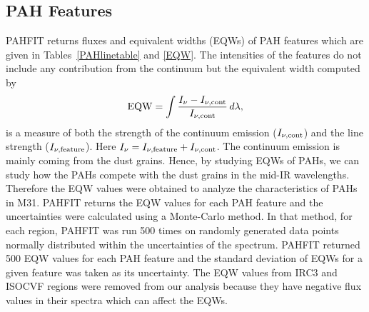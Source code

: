 \subsection{PAH Features}

PAHFIT returns fluxes and equivalent widths (EQWs) of PAH features which are given in Tables~\ref{PAHlinetable} and \ref{EQW}. The intensities of the features do not include any contribution from the continuum but the equivalent width computed by
\begin{equation}
{\rm EQW}=\int \frac{I_{\nu} - I_{\nu, {\rm cont}}}{I_{\nu, {\rm cont}}} \,d\lambda,
\end{equation}
is a measure of both the strength of the continuum emission ($I_{\nu, {\rm cont}} $) and the line strength ($I_{\nu,{\rm feature}}$). 
Here $I_{\nu} =I_{\nu,{\rm feature}}+ I_{\nu, {\rm cont}} $. 
The continuum emission is mainly coming from the dust grains. Hence, by studying EQWs of PAHs, we can study how the PAHs compete with the dust grains in the mid-IR wavelengths. Therefore the EQW values were obtained to analyze the characteristics of PAHs in M31. PAHFIT returns the EQW values for each PAH feature and the uncertainties were calculated using a Monte-Carlo method. In that method, for each region, PAHFIT was run 500 times on randomly generated data points  normally distributed within the uncertainties of the spectrum. PAHFIT returned 500 EQW values for each PAH feature and the standard deviation of EQWs for a given feature was taken as its uncertainty. 
The EQW values from IRC3 and ISOCVF regions were removed from our analysis because they have negative flux values in their spectra which can affect the EQWs. 


